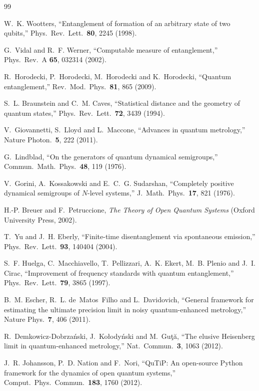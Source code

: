 \documentclass[10.5pt,a4paper]{article}
\begin{document}
\begin{thebibliography}{99}

 W.~K. Wootters, ``Entanglement of formation of an arbitrary state of two qubits,'' Phys.\ Rev.\ Lett.\ \textbf{80}, 2245 (1998).

 G.~Vidal and R.~F. Werner, ``Computable measure of entanglement,'' Phys.\ Rev.\ A \textbf{65}, 032314 (2002).

 R.~Horodecki, P.~Horodecki, M.~Horodecki and K.~Horodecki, ``Quantum entanglement,'' Rev.\ Mod.\ Phys.\ \textbf{81}, 865 (2009).

 S.~L. Braunstein and C.~M. Caves, ``Statistical distance and the geometry of quantum states,'' Phys.\ Rev.\ Lett.\ \textbf{72}, 3439 (1994).

 V.~Giovannetti, S.~Lloyd and L.~Maccone, ``Advances in quantum metrology,'' Nature Photon.\ \textbf{5}, 222 (2011).

 G.~Lindblad, ``On the generators of quantum dynamical semigroups,'' Commun.\ Math.\ Phys.\ \textbf{48}, 119 (1976).

 V.~Gorini, A.~Kossakowski and E.~C.~G. Sudarshan, ``Completely positive dynamical semigroups of $N$-level systems,'' J.\ Math.\ Phys.\ \textbf{17}, 821 (1976).

 H.-P. Breuer and F.~Petruccione, \emph{The Theory of Open Quantum Systems} (Oxford University Press, 2002).

 T.~Yu and J.~H. Eberly, ``Finite-time disentanglement via spontaneous emission,'' Phys.\ Rev.\ Lett.\ \textbf{93}, 140404 (2004).

 S.~F. Huelga, C.~Macchiavello, T.~Pellizzari, A.~K. Ekert, M.~B. Plenio and J.~I. Cirac, ``Improvement of frequency standards with quantum entanglement,'' Phys.\ Rev.\ Lett.\ \textbf{79}, 3865 (1997).

 B.~M. Escher, R.~L. de~Matos~Filho and L.~Davidovich, ``General framework for estimating the ultimate precision limit in noisy quantum-enhanced metrology,'' Nature Phys.\ \textbf{7}, 406 (2011).

 R.~Demkowicz-Dobrza\'nski, J.~Ko\l ody\'nski and M.~Gu\c{t}\u{a}, ``The elusive Heisenberg limit in quantum-enhanced metrology,'' Nat.\ Commun.\ \textbf{3}, 1063 (2012).

 J.~R. Johansson, P.~D. Nation and F.~Nori, ``QuTiP: An open-source Python framework for the dynamics of open quantum systems,'' Comput.\ Phys.\ Commun.\ \textbf{183}, 1760 (2012).

\end{thebibliography}
\end{document}
